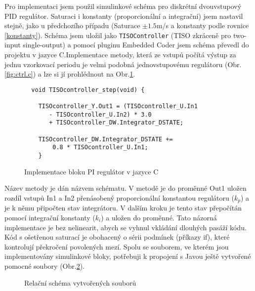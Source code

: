 \documentclass[thesis=M,czech,hidelinks]{FITthesis}[2012/06/26]
\begin{document}
Pro implementaci jsem použil simulinkové schéma pro diskrétní dvouvstupový PID regulátor. Saturaci i konstanty (proporcionální a integrační) jsem nastavil stejně, jako u předchozího případu (Saturace $\pm1.5$m/s a konstanty podle rovnice \ref{konstanty}). Schéma jsem uložil jako \texttt{TISOController} (TISO zkráceně pro two-input single-output) a pomocí pluginu Embedded Coder jsem schéma převedl do projektu v jazyce C.Implementace metody, která ze vstupů počítá výstup za jednu vzorkovací periodu je velmi podobná jednovstupovému regulátoru (Obr.\ref{fig:ctrl.c}) a lze si jí prohlédnout na Obr.\ref{fig:ctrl2.c}. 
\begin{figure}[h]
              
  \begin{verbatim}
  void TISOcontroller_step(void) {
 
    TISOcontroller_Y.Out1 = (TISOcontroller_U.In1 
       - TISOcontroller_U.In2) * 3.0 
       + TISOcontroller_DW.Integrator_DSTATE;
    
    TISOcontroller_DW.Integrator_DSTATE += 
        0.8 * TISOcontroller_U.In1;
    }
  \end{verbatim}      
  \caption{Implementace bloku PI regulátor v jazyce C}
  \label{fig:ctrl2.c}
\end{figure}

Název metody je dán názvem schématu. V metodě je do proměnné Out1 uložen rozdíl vstupů In1 a In2 přenásobený proporcionální konstantou regulátoru ($k_p$) a je k němu připočten stav integrátoru. V dalším kroku je tento stav přepočítán pomocí integrační konstanty ($k_i$) a uložen do proměnné. Tato názorná implementace je bez nelinearit, abych se vyhnul vkládání dlouhých pasáží kódu. Kód s ošetřenou saturací je obohacený o sérii podmínek (příkazy if), které kontrolují překročení povolených mezí. Spolu se souborem, ve kterém jsou implementovány simulinkové bloky, potřebuji k propojení s Javou ještě vytvořené pomocné soubory (Obr.\ref{fig:tisogen}).
 \begin{figure}[h]
         \centering
         \caption{Relační schéma vytvořených souborů}
         \label{fig:tisogen}
 \end{figure}
 
\end{document}
